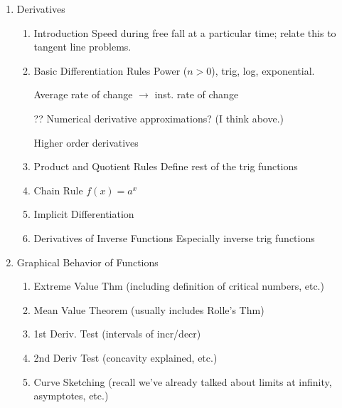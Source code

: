 \documentclass[10pt]{article}
\begin{document}
\begin{enumerate}
\begin{enumerate}
%		
%		
%		
%		

		\end{enumerate}

\item		Derivatives
		\begin{enumerate}
		\item		Introduction Speed during free fall at a particular time; relate this to tangent line problems.
%		
%		
%		
		
		\item		Basic Differentiation Rules	Power ($n>0$), trig, log, exponential.
		
		Average rate of change $\rightarrow$ inst. rate of change
		
		?? Numerical derivative approximations?  (I think above.)
		
			Higher order derivatives
		
		\item		Product and Quotient Rules  Define rest of the trig functions
		
		\item		Chain Rule	$f(x) = a^x$
		
		\item		Implicit Differentiation
		
		\item		Derivatives of Inverse Functions  Especially inverse trig functions
		\end{enumerate}
		
\item	Graphical Behavior of Functions
		\begin{enumerate}
		\item		Extreme Value Thm (including definition of critical numbers, etc.)
		\item	Mean Value Theorem (usually includes Rolle's Thm)
		\item	1st Deriv. Test (intervals of incr/decr)
		\item	2nd Deriv Test (concavity explained, etc.)
		\item	Curve Sketching (recall we've already talked about limits at infinity, asymptotes, etc.)
		\end{enumerate}


\end{enumerate}
\end{document}
